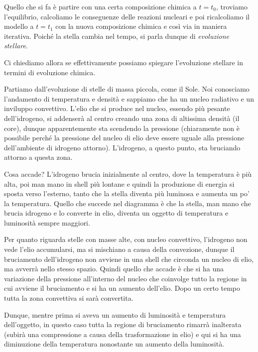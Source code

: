 Quello che si fa è partire con una certa composizione chimica a $t=t_0$, troviamo l'equilibrio, calcoliamo le conseguenze delle reazioni nucleari e poi ricalcoliamo il modello a $t=t_1$ con la nuova composizione chimica e così via in maniera iterativa. Poiché la stella cambia nel tempo, si parla dunque di \textit{evoluzione stellare}.

Ci chiediamo allora se effettivamente possiamo spiegare l'evoluzione stellare in termini di evoluzione chimica.

Partiamo dall'evoluzione di stelle di massa piccola, come il Sole. Noi conosciamo l'andamento di temperatura e densità e sappiamo che ha un nucleo radiativo e un inviluppo convettivo. L'elio che si produce nel nucleo, essendo più pesante dell'idrogeno, si addenserà al centro creando una zona di altissima densità (il core), dunque apparentemente sta scendendo la pressione (chiaramente non è possibile perché la pressione del nucleo di elio deve essere uguale alla pressione dell'ambiente di idrogeno attorno). L'idrogeno, a questo punto, sta bruciando attorno a questa zona.

Cosa accade? L'idrogeno brucia inizialmente al centro, dove la temperatura è più alta, poi man mano in shell più lontane e quindi la produzione di energia si sposta verso l'esterno, tanto che la stella diventa più luminosa e aumenta un po' la temperatura. Quello che succede nel diagramma è che la stella, man mano che brucia idrogeno e lo converte in elio, diventa un oggetto di temperatura e luminosità sempre maggiori.

\vspace{0.2cm}Per quanto riguarda stelle con masse alte, con nucleo convettivo, l'idrogeno non vede l'elio accumularsi, ma si mischiano a causa della convezione, dunque il bruciamento dell'idrogeno non avviene in una shell che circonda un nucleo di elio, ma avverrà nello stesso spazio. Quindi quello che accade è che si ha una variazione della pressione all'interno del nucleo che coinvolge tutto la regione in cui avviene il bruciamento e si ha un aumento dell'elio. Dopo un certo tempo tutta la zona convettiva si sarà convertita.

Dunque, mentre prima si aveva un aumento di luminosità e temperatura dell'oggetto, in questo caso tutta la regione di bruciamento rimarrà inalterata (subirà una compressione a causa della trasformazione in elio) e qui si ha una diminuzione della temperatura nonostante un aumento della luminosità.

